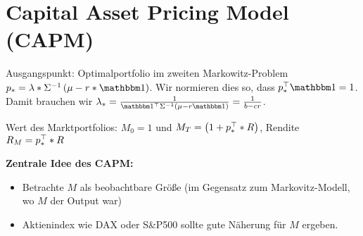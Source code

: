 \section{Capital Asset Pricing Model (CAPM)}

Ausgangspunkt: Optimalportfolio im zweiten Markowitz-Problem $p_\ast = \lambda * \Sigma^{-1}\brackets{\mu - r * \one}$. Wir normieren dies so, dass $\trans{p_\ast} \one = 1$. Damit brauchen wir $\lambda_\ast = \frac{1}{\trans{\one} \Sigma^{-1} \brackets{\mu - r\one}} = \frac{1}{b-cr}$.

Wert des Marktportfolios: $M_0 = 1$ und $M_T = \left( 1 + p_\ast^{\top} * R \right)$, Rendite $R_M = p_\ast^{\top} * R$

\textbf{Zentrale Idee des CAPM:}
\begin{itemize}[nolistsep, topsep=-\parskip]
	\item Betrachte $M$ als beobachtbare Größe (im Gegensatz zum Markovitz-Modell, wo $M$ der Output war)
	\item Aktienindex wie DAX oder S\&P500 sollte gute Näherung  für $M$ ergeben.
\end{itemize}

\vspace{\parskip}

